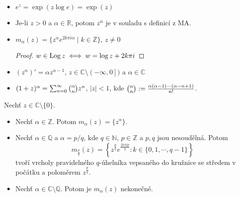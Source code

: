 \begin{properties}
\mbox{}
\vspace{-2em}
\begin{itemize}
    \item $e^z=\exp(z \log e)=\exp(z)$ 
    \item Je-li $z>0$ a $\alpha\in\mathbb{R}$, potom $z^{\alpha}$ je v souladu s definicí z MA.
    \item $m_{\alpha}(z)=\{z^{\alpha}e^{2k\pi i \alpha}\mid k\in\mathbb{Z}\}$, $z\neq 0$
    \begin{proof}$w\in \operatorname*{Log} z\iff w=\log z +2k\pi i$\end{proof}
    \item $(z^{\alpha})'=\alpha z^{\alpha-1}$, $z\in\mathbb{C}\setminus\left (-\infty,0\right ])$ a $\alpha\in\mathbb{C}$
    \item $(1+z)^{\alpha}=\sum_{n=0}^{\infty}\tbinom{\alpha}{n}z^{n} $, $\lvert z \rvert<1$, kde $\tbinom{\alpha}{n}:=\frac{\alpha(\alpha-1)\cdots(\alpha-n+1)}{n!}$.%
\end{itemize}
\end{properties}

\begin{observation}
Nechť $z \in\mathbb{C}\setminus\{0\}$.
\begin{itemize}
    \item Nechť $\alpha\in\mathbb{Z}$. Potom $m_{\alpha}(z)=\{z^{\alpha}\}$.%
    \item Nechť $\alpha\in\mathbb{Q}$ a $\alpha=p/q$, kde $q\in\mathbb{N}$, $p\in\mathbb{Z}$ a $p,q$ jsou nesoudělná. Potom $$m_{\frac{p}{q}}(z)= \left\{ z^{\frac{p}{q}}e^{\frac{2k\pi i p}{q}}: k\in\{0,1,\cdots,q-1\} \right\}$$
    tvoří vrcholy pravidelného $q$-úhelníka vepsaného do kružnice se středem v počátku a poloměrem $z^{\frac{p}{q}}$. %
    \item Nechť $\alpha\in\mathbb{C}\setminus\mathbb{Q}$. Potom je $m_{\alpha}(z)$ nekonečné.%
\end{itemize}
\end{observation}

